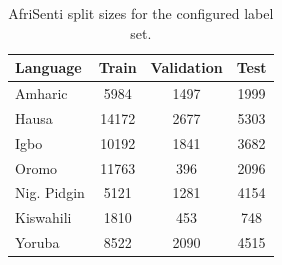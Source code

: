 \begin{table}[t]
\centering
\caption{AfriSenti split sizes for the configured label set.}
\label{tab:dataset_stats}
\small
\begin{tabular}{lccc}
\toprule
Language & Train & Validation & Test \\
\midrule
Amharic & 5984 & 1497 & 1999 \\
Hausa & 14172 & 2677 & 5303 \\
Igbo & 10192 & 1841 & 3682 \\
Oromo & 11763 & 396 & 2096 \\
Nig. Pidgin & 5121 & 1281 & 4154 \\
Kiswahili & 1810 & 453 & 748 \\
Yoruba & 8522 & 2090 & 4515 \\
\bottomrule
\end{tabular}
\end{table}